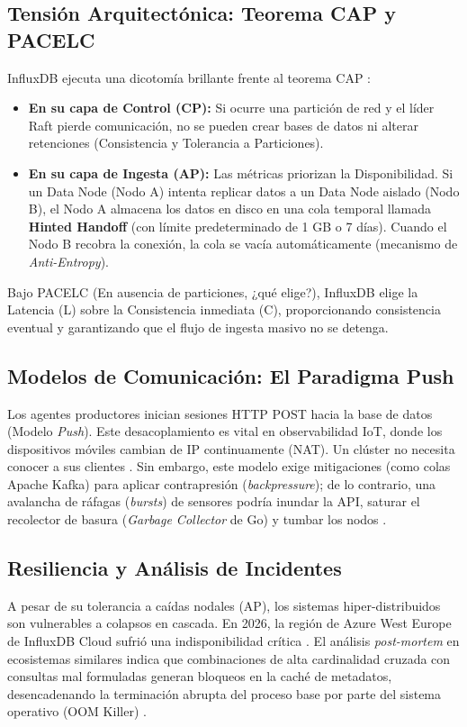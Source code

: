\documentclass[12pt,a4paper]{article}
\begin{document}
\subsection{Tensión Arquitectónica: Teorema CAP y PACELC}
InfluxDB ejecuta una dicotomía brillante frente al teorema CAP \cite{energy2024}:
\begin{itemize}
    \item \textbf{En su capa de Control (CP):} Si ocurre una partición de red y el líder Raft pierde comunicación, no se pueden crear bases de datos ni alterar retenciones (Consistencia y Tolerancia a Particiones).
    \item \textbf{En su capa de Ingesta (AP):} Las métricas priorizan la Disponibilidad. Si un Data Node (Nodo A) intenta replicar datos a un Data Node aislado (Nodo B), el Nodo A almacena los datos en disco en una cola temporal llamada \textbf{Hinted Handoff} (con límite predeterminado de 1 GB o 7 días). Cuando el Nodo B recobra la conexión, la cola se vacía automáticamente (mecanismo de \textit{Anti-Entropy}). 
\end{itemize}
Bajo PACELC (En ausencia de particiones, ¿qué elige?), InfluxDB elige la Latencia (L) sobre la Consistencia inmediata (C), proporcionando consistencia eventual y garantizando que el flujo de ingesta masivo no se detenga.

\subsection{Modelos de Comunicación: El Paradigma Push}
Los agentes productores inician sesiones HTTP POST hacia la base de datos (Modelo \textit{Push}). Este desacoplamiento es vital en observabilidad IoT, donde los dispositivos móviles cambian de IP continuamente (NAT). Un clúster no necesita conocer a sus clientes \cite{ntop2023}. Sin embargo, este modelo exige mitigaciones (como colas Apache Kafka) para aplicar contrapresión (\textit{backpressure}); de lo contrario, una avalancha de ráfagas (\textit{bursts}) de sensores podría inundar la API, saturar el recolector de basura (\textit{Garbage Collector} de Go) y tumbar los nodos \cite{kopp2025}.

\subsection{Resiliencia y Análisis de Incidentes}
A pesar de su tolerancia a caídas nodales (AP), los sistemas hiper-distribuidos son vulnerables a colapsos en cascada. En 2026, la región de Azure West Europe de InfluxDB Cloud sufrió una indisponibilidad crítica \cite{pulsapi2026}. El análisis \textit{post-mortem} en ecosistemas similares indica que combinaciones de alta cardinalidad cruzada con consultas mal formuladas generan bloqueos en la caché de metadatos, desencadenando la terminación abrupta del proceso base por parte del sistema operativo (OOM Killer) \cite{githubOOM}.
\end{document}
